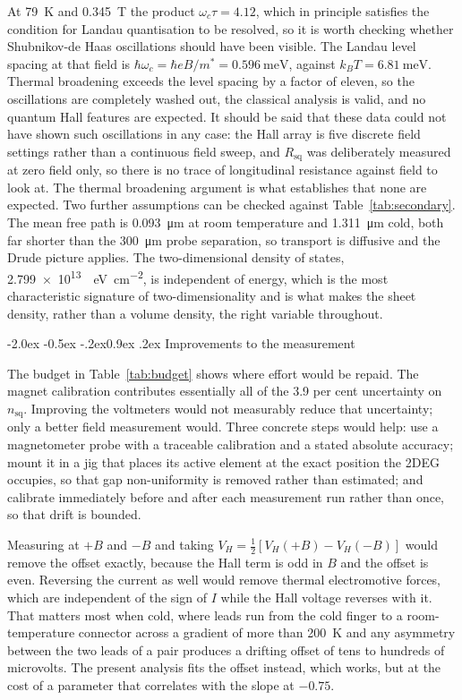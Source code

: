 \documentclass[11pt,a4paper]{article}
\makeatletter
\renewcommand\subsection{\@startsection{subsection}{2}{\z@}%
  {-2.0ex \@plus -0.5ex \@minus -.2ex}{0.9ex \@plus .2ex}%
  {\normalfont\normalsize\bfseries}}
\newcommand{\Rsq}{R_{\mathrm{sq}}}
\newcommand{\nsq}{n_{\mathrm{sq}}}
\makeatother
\begin{document}
At \qty{79}{\kelvin} and \qty{0.345}{\tesla} the product $\omega_c\tau = 4.12$, which in
principle satisfies the condition for Landau quantisation to be resolved, so it is worth
checking whether Shubnikov-de Haas oscillations should have been visible. The Landau level
spacing at that field is $\hbar\omega_c = \hbar e B/m^{*} =
\qty{0.596}{\milli\electronvolt}$, against $k_BT = \qty{6.81}{\milli\electronvolt}$. Thermal
broadening exceeds the level spacing by a factor of eleven, so the oscillations are completely
washed out, the classical analysis is valid, and no quantum Hall features are expected. It
should be said that these data could not have shown such oscillations in any case: the Hall
array is five discrete field settings rather than a continuous field sweep, and $\Rsq$ was
deliberately measured at zero field only, so there is no trace of longitudinal resistance
against field to look at. The thermal broadening argument is what establishes that none are
expected. Two further assumptions can be checked against
Table~\ref{tab:secondary}. The mean free path is \qty{0.093}{\micro\metre} at room temperature
and \qty{1.311}{\micro\metre} cold, both far shorter than the \qty{300}{\micro\metre} probe
separation, so transport is diffusive and the Drude picture applies. The two-dimensional
density of states, \qty{2.799e13}{\per\electronvolt\per\centi\metre\squared}, is independent
of energy, which is the most characteristic signature of two-dimensionality and is what makes
the sheet density, rather than a volume density, the right variable throughout.

\subsection{Improvements to the measurement}
\label{sec:improvements}

The budget in Table~\ref{tab:budget} shows where effort would be repaid. The magnet
calibration contributes essentially all of the \num{3.9} per cent uncertainty on $\nsq$.
Improving the voltmeters would not measurably reduce that uncertainty; only a better field
measurement would. Three concrete steps would help: use a magnetometer probe with a traceable calibration and a
stated absolute accuracy; mount it in a jig that places its active element at the exact
position the 2DEG occupies, so that gap non-uniformity is removed rather than estimated; and
calibrate immediately before and after each measurement run rather than once, so that drift is
bounded.

Measuring at $+B$ and $-B$ and taking $V_H = \tfrac12[V_H(+B)-V_H(-B)]$ would remove the
offset exactly, because the Hall term is odd in $B$ and the offset is even. Reversing the
current as well would remove thermal electromotive forces, which are independent of the sign
of $I$ while the Hall voltage reverses with it. That matters most when cold, where leads run
from the cold finger to a room-temperature connector across a gradient of more than
\qty{200}{\kelvin} and any asymmetry between the two leads of a pair produces a drifting
offset of tens to hundreds of microvolts. The present analysis fits the offset instead, which
works, but at the cost of a parameter that correlates with the slope at $-0.75$.
\end{document}
